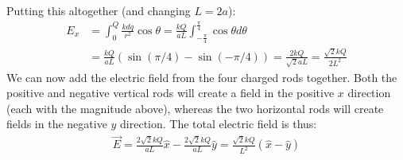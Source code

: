 \begin{solution}
	Putting this altogether (and changing $L=2a$):
	\begin{align*}
	E_x &= \int_0^Q\frac{kdq}{r^2}\cos\theta = \frac{kQ}{aL}\int_{-\frac{\pi}{4}}^{\frac{\pi}{4}}\cos\theta d\theta\\
	&=\frac{kQ}{aL}(\sin(\pi/4)-\sin(-\pi/4))=\frac{2kQ}{\sqrt{2}aL}=\frac{\sqrt{2}kQ}{2L^2}
	\end{align*}
	We can now add the electric field from the four charged rods together. Both the positive and negative vertical rods will create a field in the positive $x$ direction (each with the magnitude above), whereas the two horizontal rods will create fields in the negative $y$ direction. The total electric field is thus:
	\begin{align*}
	\vec E = \frac{2\sqrt{2}kQ}{aL}\hat x - \frac{2\sqrt{2}kQ}{aL}\hat y=\frac{\sqrt{2}kQ}{L^2}(\hat x - \hat y)
	\end{align*}
\end{solution}

